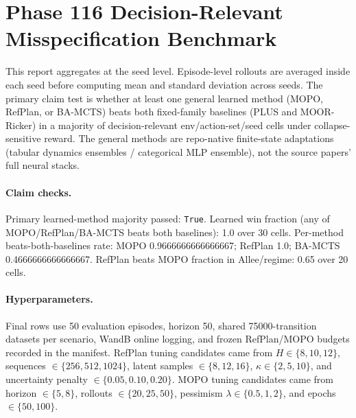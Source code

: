 \documentclass{article}
\begin{document}
\section*{Phase 116 Decision-Relevant Misspecification Benchmark}

This report aggregates at the seed level. Episode-level rollouts are averaged
inside each seed before computing mean and standard deviation across seeds.
The primary claim test is whether at least one general learned method (MOPO,
RefPlan, or BA-MCTS) beats both fixed-family baselines (PLUS and MOOR-Ricker) in
a majority of decision-relevant env/action-set/seed cells under collapse-sensitive
reward. The general methods are repo-native finite-state adaptations (tabular
dynamics ensembles / categorical MLP ensemble), not the source papers' full neural
stacks.

\paragraph{Claim checks.}
Primary learned-method majority passed: \texttt{True}.
Learned win fraction (any of MOPO/RefPlan/BA-MCTS beats both baselines):
1.0 over 30 cells.
Per-method beats-both-baselines rate: MOPO 0.9666666666666667; RefPlan 1.0; BA-MCTS 0.4666666666666667.
RefPlan beats MOPO fraction in Allee/regime:
0.65 over 20
cells.

\paragraph{Hyperparameters.}
Final rows use 50 evaluation episodes,
horizon 50, shared
75000-transition datasets per scenario, WandB online
logging, and frozen RefPlan/MOPO budgets recorded in the manifest. RefPlan
tuning candidates came from
$H\in\{8,10,12\}$, sequences $\in\{256,512,1024\}$, latent samples
$\in\{8,12,16\}$, $\kappa\in\{2,5,10\}$, and uncertainty penalty
$\in\{0.05,0.10,0.20\}$. MOPO tuning candidates came from horizon
$\in\{5,8\}$, rollouts $\in\{20,25,50\}$, pessimism $\lambda\in\{0.5,1,2\}$,
and epochs $\in\{50,100\}$.
\end{document}
